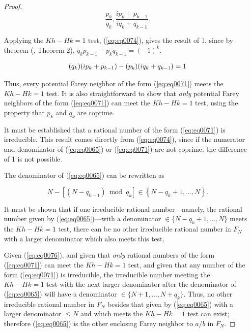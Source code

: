 \documentclass{esub2acm}
\begin{document}
\begin{proof}
\begin{equation}
\label{eq:eq0072}
\frac{p_k }{q_k },\frac{ip_k  + p_{k - 1} }{iq_k  + q_{k - 1} }.
\end{equation}

Applying the $Kh - Hk = 1$ test, (\ref{eq:eq0074}), gives the
result of 1, since by theorem
(\cite{KhinchinClassic}, Theorem 2),
$q_kp_{k-1}-p_kq_{k-1}=(-1)^k$.

\begin{equation}
\label{eq:eq0074}
\begin{array}{*{20}c}
{(q_k )(ip_k  + p_{k - 1} ) - (p_k )(iq_k  + q_{k - 1} ) = 1}
\end{array}
\end{equation}

Thus, every potential Farey neighbor of the form (\ref{eq:eq0071})
meets the $Kh - Hk = 1$ test.  It is also straightforward
to show that \emph{only} potential Farey neighbors of the
form (\ref{eq:eq0071}) can meet the $Kh-Hk=1$ test, using the
property that $p_k$ and $q_k$ are coprime.

It must be established that a
rational number of the form (\ref{eq:eq0071})
is irreducible.  This result comes directly from (\ref{eq:eq0074}),
since if the numerator
and denominator of (\ref{eq:eq0065}) or
(\ref{eq:eq0071}) are not coprime, the difference of 1 is
not possible.

The denominator of (\ref{eq:eq0065})
can be rewritten as

\begin{equation}
\label{eq:eq0076}
N - \left[ {\left( {N - q_{k - 1} } \right)\bmod q_k } \right] \in \left\{ {N - q_k  + 1,...,N} \right\}.
\end{equation}

It must be shown that if one irreducible
rational number---namely, the rational number given by
(\ref{eq:eq0065})---with a denominator
$\in \{ N-q_k+1,\ldots{} ,N \}$ meets the $Kh - Hk = 1$
test, there can be no other irreducible rational number
in $F_N$ with a larger
denominator which also meets this test.

Given (\ref{eq:eq0076}), and given that \emph{only} rational numbers of the form
(\ref{eq:eq0071}) can meet the $Kh-Hk=1$ test, and given that any number of the
form (\ref{eq:eq0071}) is irreducible, the irreducible number meeting the
$Kh-Hk=1$ test with the next larger denominator after the denominator of (\ref{eq:eq0065})
will have a denominator $\in \{ N+1, \ldots, N+q_k \}$.  Thus,
no other irreducible rational number in $F_N$ besides that given
by (\ref{eq:eq0065}) with a larger denominator
$\leq N$ and which meets the $Kh - Hk = 1$ test can exist; therefore
(\ref{eq:eq0065}) is the other enclosing Farey neighbor to
$a/b$ in $F_N$.
\end{proof}
\end{document}
